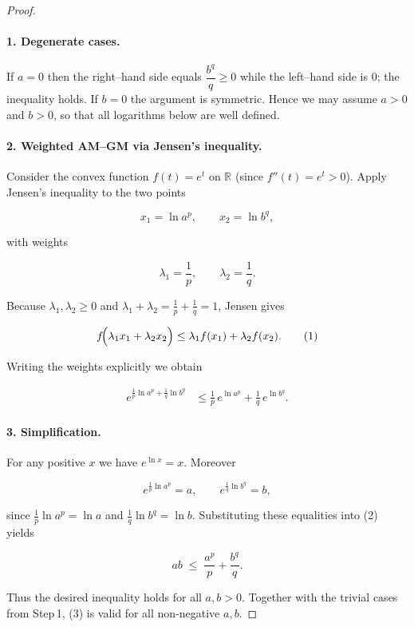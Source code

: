 \begin{proof}
\paragraph{1. Degenerate cases.}
If \(a=0\) then the right–hand side equals \(\dfrac{b^{q}}{q}\ge 0\) while the left–hand side is \(0\); the inequality holds.  
If \(b=0\) the argument is symmetric.  
Hence we may assume \(a>0\) and \(b>0\), so that all logarithms below are well defined.

\paragraph{2. Weighted AM–GM via Jensen’s inequality.}
Consider the convex function \(f(t)=e^{t}\) on \(\mathbb{R}\) (since \(f''(t)=e^{t}>0\)).  
Apply Jensen’s inequality to the two points  

\[
x_{1}= \ln a^{p},\qquad x_{2}= \ln b^{q},
\]

with weights  

\[
\lambda_{1}= \frac{1}{p},\qquad \lambda_{2}= \frac{1}{q}.
\]

Because \(\lambda_{1},\lambda_{2}\ge 0\) and \(\lambda_{1}+\lambda_{2}= \frac1p+\frac1q =1\), Jensen gives  

\[
f\!\Bigl(\lambda_{1}x_{1}+\lambda_{2}x_{2}\Bigr)
\le
\lambda_{1}f(x_{1})+\lambda_{2}f(x_{2}).
\tag{1}
\]

Writing the weights explicitly we obtain  

\begin{align*}
e^{\frac1p\ln a^{p}+\frac1q\ln b^{q}}
&\le
\frac1p\,e^{\ln a^{p}}+\frac1q\,e^{\ln b^{q}} .
\end{align*}

\paragraph{3. Simplification.}
For any positive \(x\) we have \(e^{\ln x}=x\). Moreover  

\[
e^{\frac1p\ln a^{p}} = a,\qquad
e^{\frac1q\ln b^{q}} = b,
\]

since \(\frac1p\ln a^{p}= \ln a\) and \(\frac1q\ln b^{q}= \ln b\).  
Substituting these equalities into (2) yields  

\[
ab \;\le\; \frac{a^{p}}{p}+\frac{b^{q}}{q}.
\tag{3}
\]

Thus the desired inequality holds for all \(a,b>0\). Together with the trivial cases from Step 1, (3) is valid for all non‑negative \(a,b\).


\end{proof}
